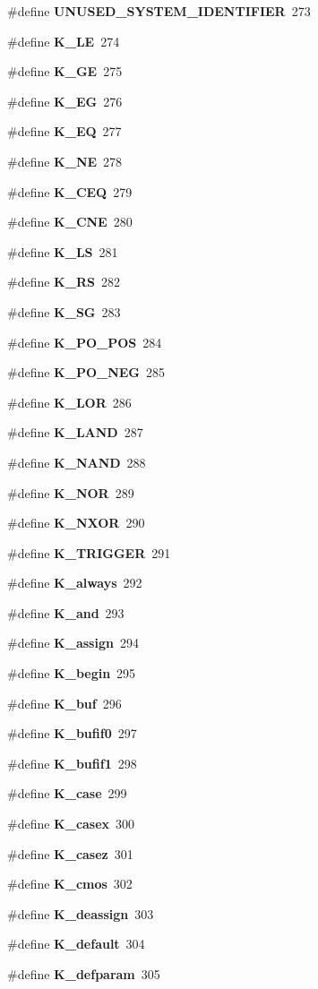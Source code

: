 \begin{CompactItemize}
\item 
\#define {\bf UNUSED\_\-SYSTEM\_\-IDENTIFIER}\ 273
\item 
\#define {\bf K\_\-LE}\ 274
\item 
\#define {\bf K\_\-GE}\ 275
\item 
\#define {\bf K\_\-EG}\ 276
\item 
\#define {\bf K\_\-EQ}\ 277
\item 
\#define {\bf K\_\-NE}\ 278
\item 
\#define {\bf K\_\-CEQ}\ 279
\item 
\#define {\bf K\_\-CNE}\ 280
\item 
\#define {\bf K\_\-LS}\ 281
\item 
\#define {\bf K\_\-RS}\ 282
\item 
\#define {\bf K\_\-SG}\ 283
\item 
\#define {\bf K\_\-PO\_\-POS}\ 284
\item 
\#define {\bf K\_\-PO\_\-NEG}\ 285
\item 
\#define {\bf K\_\-LOR}\ 286
\item 
\#define {\bf K\_\-LAND}\ 287
\item 
\#define {\bf K\_\-NAND}\ 288
\item 
\#define {\bf K\_\-NOR}\ 289
\item 
\#define {\bf K\_\-NXOR}\ 290
\item 
\#define {\bf K\_\-TRIGGER}\ 291
\item 
\#define {\bf K\_\-always}\ 292
\item 
\#define {\bf K\_\-and}\ 293
\item 
\#define {\bf K\_\-assign}\ 294
\item 
\#define {\bf K\_\-begin}\ 295
\item 
\#define {\bf K\_\-buf}\ 296
\item 
\#define {\bf K\_\-bufif0}\ 297
\item 
\#define {\bf K\_\-bufif1}\ 298
\item 
\#define {\bf K\_\-case}\ 299
\item 
\#define {\bf K\_\-casex}\ 300
\item 
\#define {\bf K\_\-casez}\ 301
\item 
\#define {\bf K\_\-cmos}\ 302
\item 
\#define {\bf K\_\-deassign}\ 303
\item 
\#define {\bf K\_\-default}\ 304
\item 
\#define {\bf K\_\-defparam}\ 305
\item 

\end{CompactItemize}
